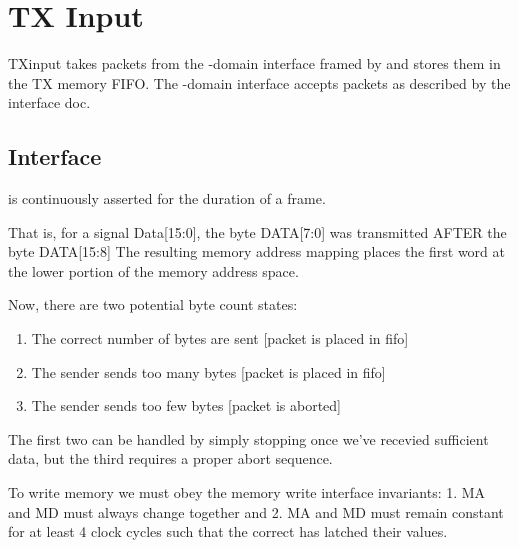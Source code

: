 \section{TX Input}

TXinput takes packets from the -domain interface framed
by  and stores them in the TX memory FIFO. The
-domain interface accepts packets as described by the
interface doc.

\subsection{Interface}
 is continuously asserted for the duration of a frame. 

That is, for a signal Data[15:0], the byte DATA[7:0] was transmitted
AFTER the byte DATA[15:8] The resulting memory address mapping places
the first word at the lower portion of the memory address space.

Now, there are two potential byte count states:
\begin{enumerate}
\item The correct number of bytes are sent [packet is placed in fifo]
\item The sender sends too many bytes [packet is placed in fifo]
\item The sender sends too few bytes [packet is aborted]
\end{enumerate}

The first two can be handled by simply stopping once we've recevied
sufficient data, but the third requires a proper abort sequence.

To write memory we must obey the memory write interface invariants: 1.
MA and MD must always change together and 2. MA and MD must remain
constant for at least 4 clock cycles such that the correct
 has latched their values.


